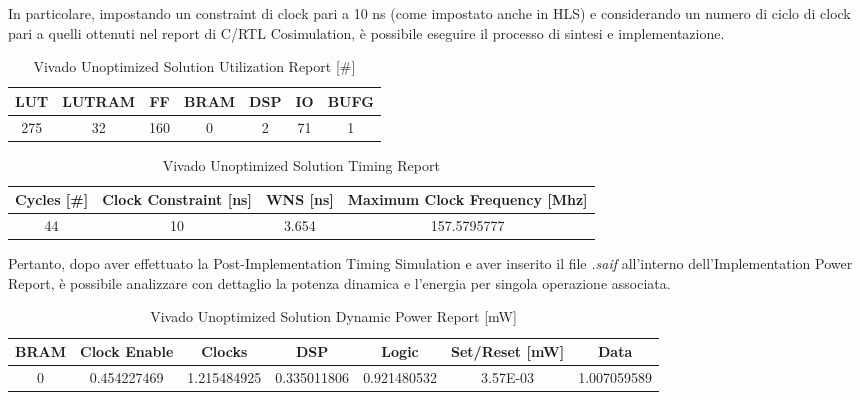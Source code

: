 
In particolare, impostando un constraint di clock pari a 10 ns (come impostato anche in HLS) e considerando un numero di ciclo di clock pari a quelli ottenuti nel report di C/RTL Cosimulation, è possibile eseguire il processo di sintesi e implementazione.
\\
\begin{table}[H]
    \centering
    \begin{tabular}{|c|c|c|c|c|c|c|}
        \hline
        \textbf{LUT} & \textbf{LUTRAM} & \textbf{FF} & \textbf{BRAM} & \textbf{DSP} & \textbf{IO} & \textbf{BUFG} \\
        \hline
        275 & 32 & 160 & 0 & 2 & 71 & 1 \\
        \hline
    \end{tabular}
    \caption{Vivado Unoptimized Solution Utilization Report [\#]}
    \label{tab:vivado-unoptimized-solution-utilization-reproot}
\end{table}

\begin{table}[H]
    \centering
    \begin{tabular}{|c|c|c|c|}
        \hline
        \textbf{Cycles} [\#] & \textbf{Clock Constraint} [ns] & \textbf{WNS} [ns] & \textbf{Maximum Clock Frequency} [Mhz] \\
        \hline
        44 & 10 & 3.654 & 157.5795777 \\
        \hline
    \end{tabular}
    \caption{Vivado Unoptimized Solution Timing Report}
    \label{tab:vivado-unoptimized-solution-timing-reproot}
\end{table}

Pertanto, dopo aver effettuato la Post-Implementation Timing Simulation e aver inserito il file \textit{.saif} all'interno dell'Implementation Power Report, è possibile analizzare con dettaglio la potenza dinamica e l'energia per singola operazione associata.

\begin{table}[H]
    \centering
    \begin{tabular}{|c|c|c|c|c|c|c|}
        \hline
        \textbf{BRAM} & \textbf{Clock Enable} & \textbf{Clocks} & \textbf{DSP} & \textbf{Logic} & \textbf{Set/Reset} [mW] & \textbf{Data} \\
        \hline
        0 & 0.454227469 & 1.215484925 & 0.335011806 & 0.921480532 & 3.57E-03 & 1.007059589 \\
        \hline
    \end{tabular}
    \caption{Vivado Unoptimized Solution Dynamic Power Report [mW]}
    \label{tab:vivado-unoptimized-solution-dynamic-power-reproot}
\end{table}

